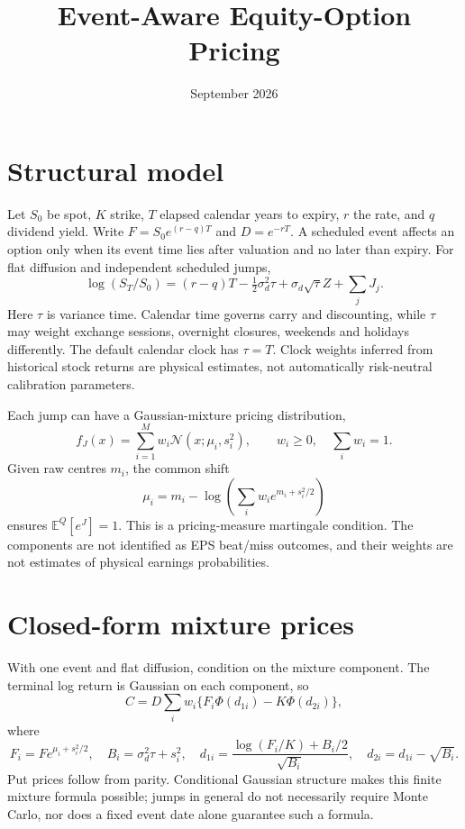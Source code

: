 \documentclass[11pt]{article}
\title{Event-Aware Equity-Option Pricing}
\author{}\date{September 2026}
\newcommand{\E}{\mathbb E}
\begin{document}
\maketitle

\section{Structural model}
Let $S_0$ be spot, $K$ strike, $T$ elapsed calendar years to expiry, $r$ the rate,
and $q$ dividend yield. Write $F=S_0e^{(r-q)T}$ and $D=e^{-rT}$.
A scheduled event affects an option only when its event time lies after valuation
and no later than expiry. For flat diffusion and independent scheduled jumps,
\[
 \log(S_T/S_0)=(r-q)T-\tfrac12\sigma_d^2\tau
       +\sigma_d\sqrt{\tau}Z+\sum_j J_j.
\]
Here $\tau$ is variance time. Calendar time governs carry and discounting, while
$\tau$ may weight exchange sessions, overnight closures, weekends and holidays
differently. The default calendar clock has $\tau=T$. Clock weights inferred
from historical stock returns are physical estimates, not automatically
risk-neutral calibration parameters.

Each jump can have a Gaussian-mixture pricing distribution,
\[
 f_J(x)=\sum_{i=1}^{M}w_i\mathcal N(x;\mu_i,s_i^2),\qquad
 w_i\ge0,\quad\sum_iw_i=1.
\]
Given raw centres $m_i$, the common shift
\[
 \mu_i=m_i-\log\left(\sum_iw_i e^{m_i+s_i^2/2}\right)
\]
ensures $\E^Q[e^J]=1$. This is a pricing-measure martingale condition. The
components are not identified as EPS beat/miss outcomes, and their weights are
not estimates of physical earnings probabilities.

\section{Closed-form mixture prices}
With one event and flat diffusion, condition on the mixture component. The
terminal log return is Gaussian on each component, so
\[
 C=D\sum_iw_i\{F_i\Phi(d_{1i})-K\Phi(d_{2i})\},
\]
where
\[
 F_i=Fe^{\mu_i+s_i^2/2},\quad B_i=\sigma_d^2\tau+s_i^2,\quad
 d_{1i}=\frac{\log(F_i/K)+B_i/2}{\sqrt{B_i}},\quad d_{2i}=d_{1i}-\sqrt{B_i}.
\]
Put prices follow from parity. Conditional Gaussian structure makes this finite
mixture formula possible; jumps in general do not necessarily require Monte
Carlo, nor does a fixed event date alone guarantee such a formula.
\end{document}
